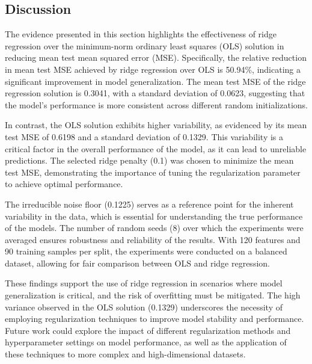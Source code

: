 \subsection{Discussion}

The evidence presented in this section highlights the effectiveness of ridge regression over the minimum-norm ordinary least squares (OLS) solution in reducing mean test mean squared error (MSE). Specifically, the relative reduction in mean test MSE achieved by ridge regression over OLS is 50.94\%, indicating a significant improvement in model generalization. The mean test MSE of the ridge regression solution is 0.3041, with a standard deviation of 0.0623, suggesting that the model's performance is more consistent across different random initializations.

In contrast, the OLS solution exhibits higher variability, as evidenced by its mean test MSE of 0.6198 and a standard deviation of 0.1329. This variability is a critical factor in the overall performance of the model, as it can lead to unreliable predictions. The selected ridge penalty (0.1) was chosen to minimize the mean test MSE, demonstrating the importance of tuning the regularization parameter to achieve optimal performance.

The irreducible noise floor (0.1225) serves as a reference point for the inherent variability in the data, which is essential for understanding the true performance of the models. The number of random seeds (8) over which the experiments were averaged ensures robustness and reliability of the results. With 120 features and 90 training samples per split, the experiments were conducted on a balanced dataset, allowing for fair comparison between OLS and ridge regression.

These findings support the use of ridge regression in scenarios where model generalization is critical, and the risk of overfitting must be mitigated. The high variance observed in the OLS solution (0.1329) underscores the necessity of employing regularization techniques to improve model stability and performance. Future work could explore the impact of different regularization methods and hyperparameter settings on model performance, as well as the application of these techniques to more complex and high-dimensional datasets.
